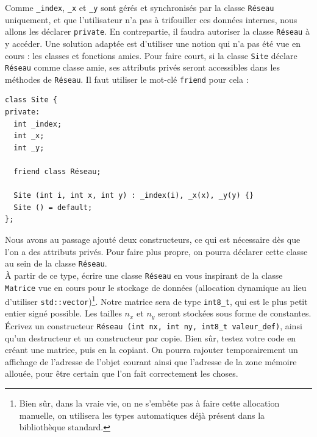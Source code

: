 \documentclass{book}
\newcommand{\inline}[1]{\texttt{#1}}
\begin{document}
Comme \inline{_index}, \inline{_x} et \inline{_y} sont gérés et synchronisés par la classe \inline{Réseau} uniquement, et que l'utilisateur n'a pas à trifouiller ces données internes, nous allons les déclarer \inline{private}. En contrepartie, il faudra autoriser la classe \inline{Réseau} à y accéder. Une solution adaptée est d'utiliser une notion qui n'a pas été vue en cours : les classes et fonctions amies. Pour faire court, si la classe \inline{Site} déclare \inline{Réseau} comme classe amie, ses attributs privés seront accessibles dans les méthodes de \inline{Réseau}. Il faut utiliser le mot-clé \inline{friend} pour cela :
\begin{verbatim}
class Site {
private:
  int _index;
  int _x;
  int _y;

  friend class Réseau;

  Site (int i, int x, int y) : _index(i), _x(x), _y(y) {}
  Site () = default;
};
\end{verbatim}
Nous avons au passage ajouté deux constructeurs, ce qui est nécessaire dès que l'on a des attributs privés. Pour faire plus propre, on pourra déclarer cette classe au sein de la classe \inline{Réseau}.\\

À partir de ce type, écrire une classe \inline{Réseau} en vous inspirant de la classe \inline{Matrice} vue en cours pour le stockage de données (allocation dynamique au lieu d'utiliser \inline{std::vector})\footnote{Bien sûr, dans la vraie vie, on ne s'embête pas à faire cette allocation manuelle, on utilisera les types automatiques déjà présent dans la bibliothèque standard.}. Notre matrice sera de type \inline{int8_t}, qui est le plus petit entier signé possible. Les tailles $n_x$ et $n_y$ seront stockées sous forme de constantes. Écrivez un constructeur \inline{Réseau (int nx, int ny, int8_t valeur_def)}, ainsi qu'un destructeur et un constructeur par copie. Bien sûr, testez votre code en créant une matrice, puis en la copiant. On pourra rajouter temporairement un affichage de l'adresse de l'objet courant ainsi que l'adresse de la zone mémoire allouée, pour être certain que l'on fait correctement les choses.\\
\end{document}
